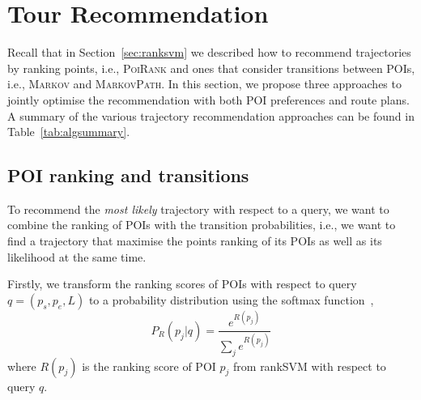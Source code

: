 
\section{Tour Recommendation}
\label{sec:recommendation}
\secmoveup

Recall that in Section~\ref{sec:ranksvm} we described how to recommend trajectories by ranking points,
i.e., \textsc{PoiRank} %
and ones that consider transitions between POIs, i.e., \textsc{Markov} and \textsc{MarkovPath}.
In this section, we propose three approaches to %
jointly optimise the recommendation with both POI preferences and route plans.
A summary of the various trajectory recommendation approaches can be found in Table~\ref{tab:algsummary}.


\subsection{POI ranking and transitions}
\label{sec:rank+markov}
\secmoveup


To recommend the \textit{most likely} trajectory with respect to a query,
we want to combine the ranking of POIs with the transition probabilities,
i.e., we want to find a trajectory that maximise the points ranking of its POIs
as well as its likelihood at the same time.

Firstly, we transform the ranking scores of POIs with respect to query $q = (p_s, p_e, L)$
to a probability distribution using the softmax function~\cite{bishop2006},
\begin{equation}
  \label{eq:poi-probability}
  P_R(p_j | q) = \frac{e^{R(p_j)}}{\sum_j e^{R(p_j)}}
\end{equation}
where $R(p_j)$ is the ranking score of POI $p_j$ from rankSVM with respect to query $q$.


